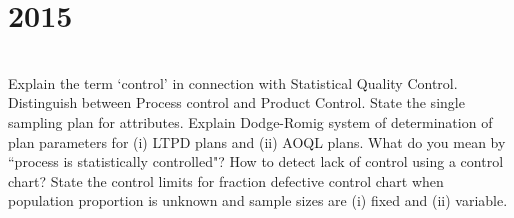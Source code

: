 \section*{2015}
\vspace{-.5cm}
\hrulefill \smallskip\\
 Explain the term `control' in connection with Statistical Quality Control. Distinguish between Process control and Product Control.
\myline
{} State the single sampling plan for attributes. Explain Dodge-Romig system of determination of plan parameters for (i) LTPD plans and (ii) AOQL plans.
\myline
{} What do you mean by ``process is statistically controlled"? How to detect lack of control using a control chart? State the control limits for fraction defective control chart when population proportion is unknown and sample sizes are (i) fixed and (ii) variable.
